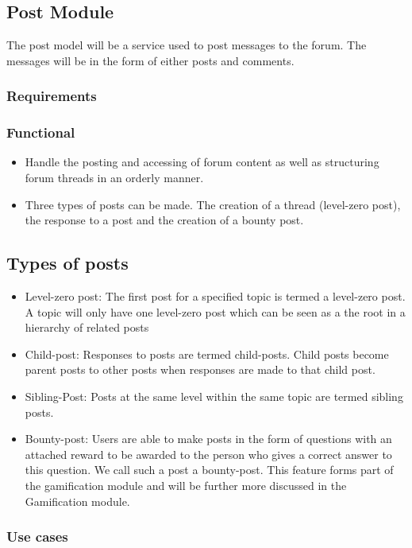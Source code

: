 \subsection{Post Module}
\par{The post model will be a service used to post messages to the forum. The messages will be in the form of either posts and comments.}
\subsubsection{Requirements}
\subsubsection*{Functional}
\begin{itemize}
\item Handle the posting and accessing of forum content as well as structuring forum threads in an orderly manner.
\item Three types of posts can be made. The creation of a thread (level-zero post), the response to a post and the creation of a bounty post. 
\end{itemize}

\subsection*{Types of posts}
\begin{itemize}
\item {Level-zero post: The first post for a specified topic is termed a level-zero post. A topic will only have one level-zero post which can be seen as a the root in a hierarchy of related posts}
\item {Child-post: Responses to posts are termed child-posts. Child posts become parent posts to other posts when responses are made to that child post.}
\item {Sibling-Post: Posts at the same level within the same topic are termed sibling posts.}
\item {Bounty-post: Users are able to make posts in the form of questions with an attached reward to be awarded to the person who gives a correct answer to this question. We call such a post a bounty-post. This feature forms part of the gamification module and will be further more discussed in the Gamification module.}
\end{itemize}

\subsubsection{Use cases}

